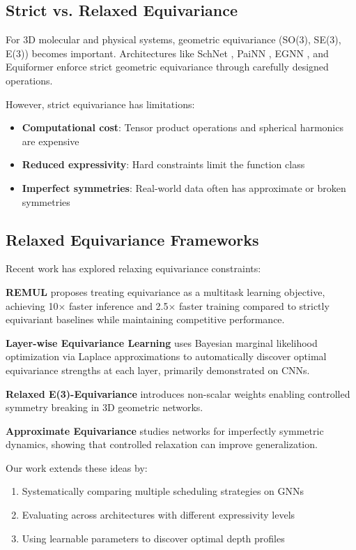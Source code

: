 \documentclass[11pt,a4paper]{article}
\begin{document}
\subsection{Strict vs. Relaxed Equivariance}

For 3D molecular and physical systems, geometric equivariance (SO(3), SE(3), E(3)) becomes important. Architectures like SchNet \cite{schutt2018schnet}, PaiNN \cite{schutt2021painn}, EGNN \cite{satorras2021egnn}, and Equiformer \cite{liao2023equiformer} enforce strict geometric equivariance through carefully designed operations.

However, strict equivariance has limitations:
\begin{itemize}
    \item \textbf{Computational cost}: Tensor product operations and spherical harmonics are expensive
    \item \textbf{Reduced expressivity}: Hard constraints limit the function class
    \item \textbf{Imperfect symmetries}: Real-world data often has approximate or broken symmetries
\end{itemize}

\subsection{Relaxed Equivariance Frameworks}

Recent work has explored relaxing equivariance constraints:

\textbf{REMUL} \cite{elhag2024remul} proposes treating equivariance as a multitask learning objective, achieving 10$\times$ faster inference and 2.5$\times$ faster training compared to strictly equivariant baselines while maintaining competitive performance.

\textbf{Layer-wise Equivariance Learning} \cite{vanderouderaa2023layerwise} uses Bayesian marginal likelihood optimization via Laplace approximations to automatically discover optimal equivariance strengths at each layer, primarily demonstrated on CNNs.

\textbf{Relaxed E(3)-Equivariance} \cite{hofgard2024relaxed} introduces non-scalar weights enabling controlled symmetry breaking in 3D geometric networks.

\textbf{Approximate Equivariance} \cite{wang2022approximate} studies networks for imperfectly symmetric dynamics, showing that controlled relaxation can improve generalization.

Our work extends these ideas by:
\begin{enumerate}
    \item Systematically comparing multiple scheduling strategies on GNNs
    \item Evaluating across architectures with different expressivity levels
    \item Using learnable parameters to discover optimal depth profiles
\end{enumerate}
\end{document}
